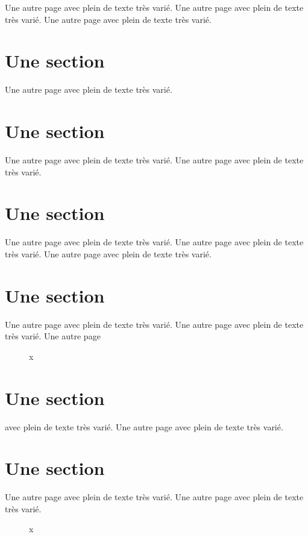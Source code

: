 \documentclass[11pt]{thesul}
\begin{document}
Une autre page avec plein de texte très varié.
Une autre page avec plein de texte très varié.
Une autre page avec plein de texte très varié.

\section{Une section}

Une autre page avec plein de texte très varié.

\section{Une section}

Une autre page avec plein de texte très varié.
Une autre page avec plein de texte très varié.

\section{Une section}

Une autre page avec plein de texte très varié.
Une autre page avec plein de texte très varié.
Une autre page avec plein de texte très varié.

\section{Une section}

Une autre page avec plein de texte très varié.
Une autre page avec plein de texte très varié.
Une autre page


\begin{figure}[htb]
\caption{x\label{toutou}}
\end{figure}

\section{Une section}

avec plein de texte très varié.
Une autre page avec plein de texte très varié.

\section{Une section}

Une autre page avec plein de texte très varié.
Une autre page avec plein de texte très varié.

\begin{figure}[htb]
\caption{x}
\end{figure}
\end{document}
